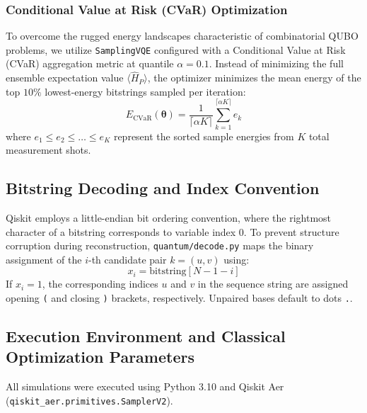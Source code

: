 \documentclass[11pt,a4paper]{article}
\begin{document}
	\subsubsection{Conditional Value at Risk (CVaR) Optimization}
	To overcome the rugged energy landscapes characteristic of combinatorial QUBO problems, we utilize \texttt{SamplingVQE} configured with a Conditional Value at Risk (CVaR) aggregation metric at quantile $\alpha = 0.1$. Instead of minimizing the full ensemble expectation value $\langle \hat{H}_P \rangle$, the optimizer minimizes the mean energy of the top $10\%$ lowest-energy bitstrings sampled per iteration:
	\begin{equation}
		E_{\text{CVaR}}(\boldsymbol{\theta}) = \frac{1}{\lceil \alpha K \rceil} \sum_{k=1}^{\lceil \alpha K \rceil} e_k
	\end{equation}
	where $e_1 \le e_2 \le \dots \le e_K$ represent the sorted sample energies from $K$ total measurement shots.
	
	\subsection{Bitstring Decoding and Index Convention}
	
	Qiskit employs a little-endian bit ordering convention, where the rightmost character of a bitstring corresponds to variable index 0. To prevent structure corruption during reconstruction, \texttt{quantum/decode.py} maps the binary assignment of the $i$-th candidate pair $k = (u, v)$ using:
	\begin{equation}
		x_i = \text{bitstring}[N - 1 - i]
	\end{equation}
	If $x_i = 1$, the corresponding indices $u$ and $v$ in the sequence string are assigned opening \texttt{(} and closing \texttt{)} brackets, respectively. Unpaired bases default to dots \texttt{.}.
	
	\subsection{Execution Environment and Classical Optimization Parameters}
	
	All simulations were executed using Python 3.10 and Qiskit Aer (\texttt{qiskit\_aer.primitives.SamplerV2}).
	
\end{document}
